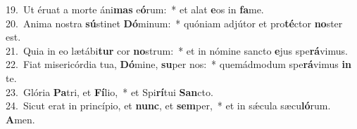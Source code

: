 {19.~}Ut éruat a morte áni\textbf{mas} e\textbf{ó}rum:~* et alat \textbf{e}os in \textbf{fa}me.\\
{20.~}Anima nostra \textbf{sú}stinet \textbf{Dó}minum:~* quóniam adjútor et pro\textbf{té}ctor \textbf{no}ster est.\\
{21.~}Quia in eo lætábi\textbf{tur} cor \textbf{no}strum:~* et in nómine sancto \textbf{e}jus spe\textbf{rá}vimus.\\
{22.~}Fiat misericórdia tua, \textbf{Dó}mine, \textbf{su}per nos:~* quemádmodum spe\textbf{rá}vimus \textbf{in} te.\\
{23.~}Glória \textbf{Pa}tri, et \textbf{Fí}lio,~* et Spi\textbf{rí}tui \textbf{San}cto.\\
{24.~}Sicut erat in princípio, et \textbf{nunc}, et \textbf{sem}per,~* et in sǽcula sæcu\textbf{ló}rum. \textbf{A}men.\\
